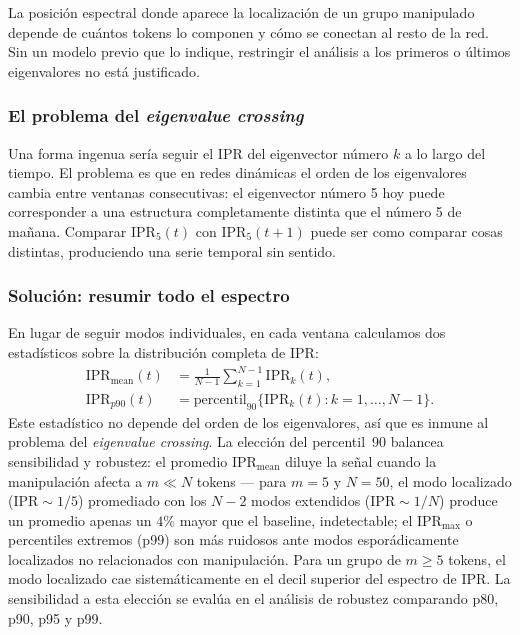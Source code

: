 La posición espectral donde aparece la localización de un grupo manipulado
depende de cuántos tokens lo componen y cómo se conectan al resto de la
red. Sin un modelo previo que lo indique, restringir el análisis a los
primeros o últimos eigenvalores no está justificado.

\subsubsection*{El problema del \emph{eigenvalue crossing}}

Una forma ingenua sería seguir el IPR del eigenvector número $k$ a lo largo
del tiempo. El problema es que en redes dinámicas el orden de los eigenvalores
cambia entre ventanas consecutivas: el eigenvector número 5 hoy puede
corresponder a una estructura completamente distinta que el número 5 de mañana.
Comparar $\mathrm{IPR}_5(t)$ con $\mathrm{IPR}_5(t+1)$ puede ser como comparar
cosas distintas, produciendo una serie temporal sin sentido.

\subsubsection*{Solución: resumir todo el espectro}

En lugar de seguir modos individuales, en cada ventana calculamos dos
estadísticos sobre la distribución completa de IPR:
\begin{align}
  \mathrm{IPR}_{\text{mean}}(t) &= \frac{1}{N-1}
    \sum_{k=1}^{N-1} \mathrm{IPR}_k(t), \label{eq:iprmean} \\[3pt]
  \mathrm{IPR}_{p90}(t) &= \mathrm{percentil}_{90}
    \bigl\{\mathrm{IPR}_k(t) : k = 1, \ldots, N-1\bigr\}. \label{eq:iprp90}
\end{align}
Este estadístico no depende del orden de los eigenvalores, así que es
inmune al problema del \emph{eigenvalue crossing}. La elección del
percentil~90 balancea sensibilidad y robustez: el promedio
$\mathrm{IPR}_{\text{mean}}$ diluye la señal cuando la manipulación
afecta a $m \ll N$ tokens --- para $m = 5$ y $N = 50$, el modo
localizado ($\mathrm{IPR} \sim 1/5$) promediado con los $N-2$ modos
extendidos ($\mathrm{IPR} \sim 1/N$) produce un promedio apenas un $4\%$
mayor que el baseline, indetectable; el $\mathrm{IPR}_\text{max}$ o
percentiles extremos (p99) son más ruidosos ante modos
esporádicamente localizados no relacionados con manipulación. Para un
grupo de $m \geq 5$ tokens, el modo localizado cae sistemáticamente en
el decil superior del espectro de IPR. La sensibilidad a esta elección
se evalúa en el análisis de robustez comparando p80, p90, p95 y p99.

